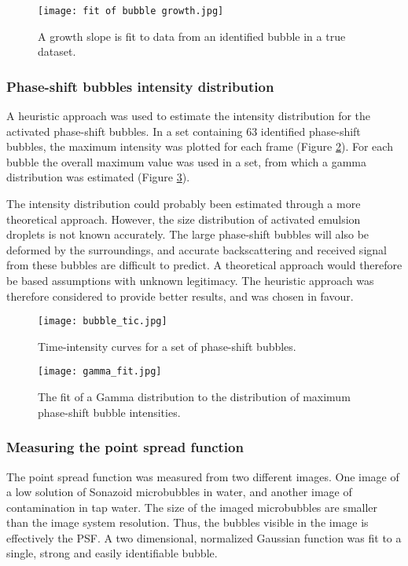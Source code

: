 \begin{figure}[h]
  \centering
  \texttt{[image: fit of bubble growth.jpg]}
  \caption{A growth slope is fit to data from an identified bubble in a true dataset.}
  \label{Fig:growth slope}
\end{figure}

\subsubsection{Phase-shift bubbles intensity distribution}
\label{PS intensity distribution}
A heuristic approach was used to estimate the intensity distribution for the activated phase-shift bubbles. In a set containing 63 identified phase-shift bubbles, the maximum intensity was plotted for each frame (Figure \ref{Fig:bubble_tic}). For each bubble the overall maximum value was used in a set, from which a gamma distribution was estimated (Figure \ref{Fig:gamma_fit}). 

The intensity distribution could probably been estimated through a more theoretical approach. However, the size distribution of activated emulsion droplets is not known accurately. The large phase-shift bubbles will also be deformed by the surroundings, and accurate backscattering and received signal from these bubbles are difficult to predict. A theoretical approach would therefore be based assumptions with unknown legitimacy. The heuristic approach was therefore considered to provide better results, and was chosen in favour. 


\begin{figure}[h]
  \centering
  \texttt{[image: bubble\_tic.jpg]}
  \caption{Time-intensity curves for a set of phase-shift bubbles.}
  \label{Fig:bubble_tic}
\end{figure}
\begin{figure}[h]
  \centering
  \texttt{[image: gamma\_fit.jpg]}
  \caption{The fit of a Gamma distribution to the distribution of maximum phase-shift bubble intensities.}
  \label{Fig:gamma_fit}
\end{figure}

\subsubsection{Measuring the point spread function}
The point spread function was measured from two different images. One image of a low solution of Sonazoid\texttrademark{} microbubbles in water, and another image of contamination in tap water. The size of the imaged microbubbles are smaller than the image system resolution. Thus, the bubbles visible in the image is effectively the PSF. A two dimensional, normalized Gaussian function was fit to a single, strong and easily identifiable bubble. 

